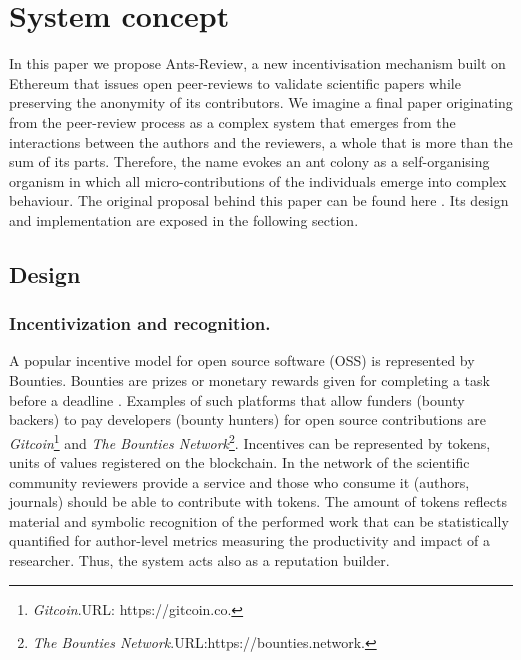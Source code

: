 \documentclass[runningheads]{llncs}
\begin{document}
\section{System concept}
In this paper we propose Ants-Review, a new incentivisation mechanism built on Ethereum that issues open peer-reviews to validate scientific papers while preserving the anonymity of its contributors. We imagine a final paper originating from the peer-review process as a complex system that emerges from the interactions between the authors and the reviewers, a whole that is more than the sum of its parts. Therefore, the name evokes an ant colony as a self-organising organism in which all micro-contributions of the individuals emerge into complex behaviour. The original proposal behind this paper can be found here \cite{AntsReview}. Its design and implementation are exposed in the following section.

\subsection{Design}

\subsubsection{Incentivization and recognition.} A popular incentive model for open source software (OSS) is represented by Bounties. Bounties are prizes or monetary rewards given for completing a task before a deadline \cite{BountyGit}. Examples of such platforms that allow funders (bounty backers) to pay developers (bounty hunters) for open source contributions are \emph{Gitcoin}\footnote[2]{\emph{Gitcoin}.\textsc{URL:} https://gitcoin.co.} and \emph{The Bounties Network}\footnote[3]{\emph{The Bounties Network}.\textsc{URL:}https://bounties.network.}. Incentives can be represented by tokens, units of values registered on the blockchain. In the network of the scientific community reviewers provide a service and those who consume it (authors, journals) should be able to contribute with tokens. The amount of tokens reflects material and symbolic recognition of the performed work that can be statistically quantified for author-level metrics measuring the productivity and impact of a researcher. Thus, the system acts also as a reputation builder.
\end{document}

